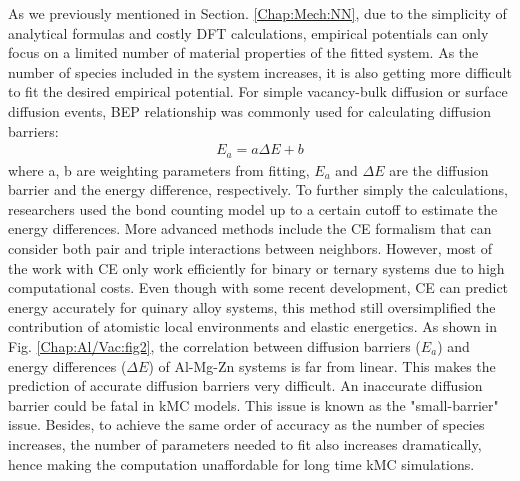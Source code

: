 As we previously mentioned in Section. \ref{Chap:Mech:NN}, due to the simplicity of analytical formulas and costly \ac{DFT} calculations, empirical potentials can only focus on a limited number of material properties of the fitted system. As the number of species included in the system increases, it is also getting more difficult to fit the desired empirical potential. For simple vacancy-bulk diffusion or surface diffusion events, \acf{BEP} relationship \cite{bronsted1924katalytische, evans1936further, bell1936theory} was commonly used for calculating diffusion barriers:
\begin{subequations}
\begin{align}
E_a = a \Delta E + b
\label{Chap:Al/Vac:eq:BEP}
\end{align}
\end{subequations}
where a, b are weighting parameters from fitting, $E_a$ and $\Delta E$ are the diffusion barrier and the energy difference, respectively. To further simply the calculations, researchers used the bond counting model up to a certain cutoff to estimate the energy differences. \cite{soisson1996monte, soisson2010atomistic} More advanced methods include the \acf{CE} formalism that can consider both pair and triple interactions between neighbors. \cite{sanchez1984generalized,zunger1994statics,van2001first,persson2010lj,natarajan2016early} However, most of the work with \ac{CE} only work efficiently for binary or ternary systems due to high computational costs. \cite{wu2016cluster} Even though with some recent development\cite{nguyen2017cluster}, \ac{CE} can predict energy accurately for quinary alloy systems, this method still oversimplified the contribution of atomistic local environments and elastic energetics. As shown in Fig. \ref{Chap:Al/Vac:fig2}, the correlation between diffusion barriers ($E_a$) and energy differences ($\Delta E$) of Al-Mg-Zn systems is far from linear. This makes the prediction of accurate diffusion barriers very difficult. An inaccurate diffusion barrier could be fatal in \ac{kMC} models. This issue is known as the "small-barrier" issue. \cite{miron2004multiple} Besides, to achieve the same order of accuracy as the number of species increases, the number of parameters needed to fit also increases dramatically\cite{castin2008use}, hence making the computation unaffordable for long time \ac{kMC} simulations.


